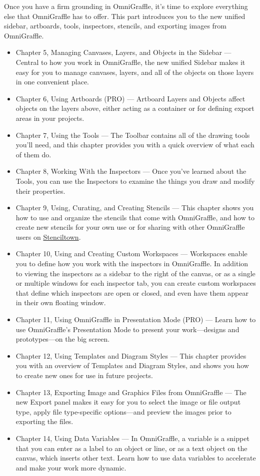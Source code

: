 \documentclass[../main.tex]{subfiles}
\begin{document}
Once you have a firm grounding in OmniGraffle, it's time to explore everything else that
OmniGraffle has to offer. This part introduces you to the new unified sidebar, artboards,
tools, inspectors, stencils, and exporting images from OmniGraffle.

\begin{itemize}
  \item Chapter 5, Managing Canvases, Layers, and Objects in the Sidebar --- Central to how you
    work in OmniGraffle, the new unified Sidebar makes it easy for you to manage canvases,
    layers, and all of the objects on those layers in one convenient place.
  \item Chapter 6, Using Artboards (PRO) --- Artboard Layers and Objects affect objects on the
    layers above, either acting as a container or for defining export areas in your projects.
  \item Chapter 7, Using the Tools --- The Toolbar contains all of the drawing tools you'll
    need, and this chapter provides you with a quick overview of what each of them do.
  \item Chapter 8, Working With the Inspectors --- Once you've learned about the Tools, you can
    use the Inspectors to examine the things you draw and modify their properties.
  \item Chapter 9, Using, Curating, and Creating Stencils --- This chapter shows you how to use
    and organize the stencils that come with OmniGraffle, and how to create new stencils for
    your own use or for sharing with other OmniGraffle users on
    \href{http://stenciltown.omnigroup.com}{Stenciltown}.
  \item Chapter 10, Using and Creating Custom Workspaces --- Workspaces enable you to define how
    you work with the inspectors in OmniGraffle. In addition to viewing the inspectors as a
    sidebar to the right of the canvas, or as a single or multiple windows for each inspector
    tab, you can create custom workspaces that define which inspectors are open or closed, and
    even have them appear in their own floating window.
  \item Chapter 11, Using OmniGraffle in Presentation Mode (PRO) --- Learn how to use
    OmniGraffle's Presentation Mode to present your work---designs and prototypes---on the big
    screen.
  \item Chapter 12, Using Templates and Diagram Styles --- This chapter provides you with an
    overview of Templates and Diagram Styles, and shows you how to create new ones for use in
    future projects.
  \item Chapter 13, Exporting Image and Graphics Files from OmniGraffle --- The new Export panel
    makes it easy for you to select the image or file output type, apply file type-specific
    options---and preview the images prior to exporting the files.
  \item Chapter 14, Using Data Variables --- In OmniGraffle, a variable is a snippet that you
    can enter as a label to an object or line, or as a text object on the canvas, which inserts
    other text. Learn how to use data variables to accelerate and make your work more dynamic.
\end{itemize}
\end{document}
